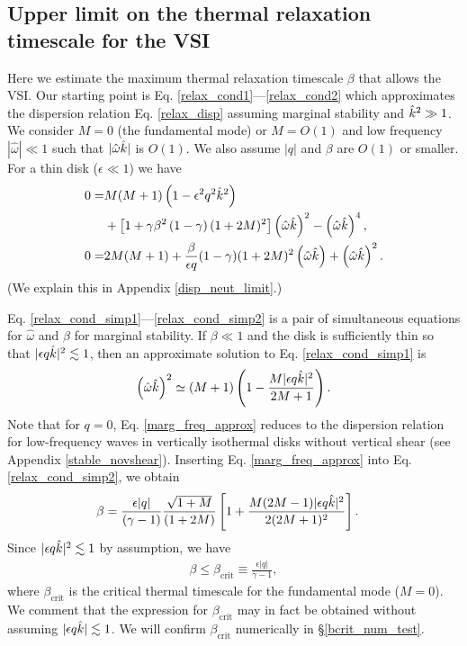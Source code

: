 \subsection{Upper limit on the thermal relaxation timescale for the
  VSI}\label{iso_vsi_beta_crit}
Here we estimate the maximum thermal relaxation timescale 
$\beta$ that allows the VSI.  
Our starting point is Eq. \ref{relax_cond1}---\ref{relax_cond2} which
approximates the dispersion relation Eq. \ref{relax_disp} assuming marginal
stability and $\hat{k}^2\gg 1$. We consider $M=0$ (the 
fundamental mode) or  $M=O(1)$ and low frequency $|\hat{\omega}|\ll
1$ such that $|\hat{\omega}\hat{k}|$ is $O(1)$. We 
also assume $|q|$ and $\beta$ are $O(1)$ or smaller. For a thin disk
($\epsilon \ll 1$) we have 
\begin{align}
 0 = &M(M+1)\left(1-\epsilon^2q^2\hat{k}^2\right) \notag\\ 
 &+ \left[1 +
    \gamma\beta^2\left(1-\gamma\right)(1+2M)^2\right]\left(\hat{\omega}\hat{k}\right)^2
   -  \left(\hat{\omega}\hat{k}\right)^4,\label{relax_cond_simp1}\\
   0= &2M(M+1) + \frac{\beta}{\epsilon q} (1-\gamma)(1+2M)^2
   \left(\hat{\omega}\hat{k}\right) + \left(\hat{\omega}\hat{k}\right)^2. \label{relax_cond_simp2}
\end{align}
(We explain this in Appendix \ref{disp_neut_limit}.)

Eq. \ref{relax_cond_simp1}---\ref{relax_cond_simp2} is a pair of
simultaneous equations for $\hat{\omega}$ and $\beta$ for marginal
stability. If $\beta\ll 1$ and the disk is sufficiently thin so that  
$|\epsilon q \hat{k} |^2\lesssim 1$, 
then an approximate solution to Eq. \ref{relax_cond_simp1} is 
\begin{align}
  \left(\hat{\omega}\hat{k}\right)^2 \simeq (M+1)\left(1 -
    \frac{M|\epsilon q \hat{k}|^2}{2M+1}\right).  \label{marg_freq_approx}
\end{align}
Note that for $q=0$, Eq. \ref{marg_freq_approx} reduces to 
the dispersion relation for low-frequency waves in vertically
isothermal disks without vertical shear (see Appendix
\ref{stable_novshear}). Inserting Eq. \ref{marg_freq_approx} into
Eq. \ref{relax_cond_simp2}, we obtain 
\begin{align}\label{bcrit_gen}
  \beta &= \frac{\epsilon|q|}{(\gamma - 1)}
  \frac{\sqrt{1+M}}{(1+2M)}\left[1 + \frac{M(2M-1)|\epsilon q
      \hat{k}|^2}{2(2M+1)^2}\right].
\end{align}
Since $|\epsilon q \hat{k}|^2\lesssim 1$ by assumption, we have  
\begin{align}\label{iso_vsi_cond}
  \beta\leq \beta_\mathrm{crit}  \equiv
  \frac{\epsilon|q|}{\gamma-1}, 
\end{align}
where $\beta_\mathrm{crit}$
is the critical thermal timescale for the fundamental mode
($M=0$). We comment that the expression for $\beta_\mathrm{crit}$ may
in fact be obtained without assuming $|\epsilon q\hat{k}|\lesssim 1$.
We will confirm $\beta_\mathrm{crit}$ numerically in 
\S\ref{bcrit_num_test}. 

